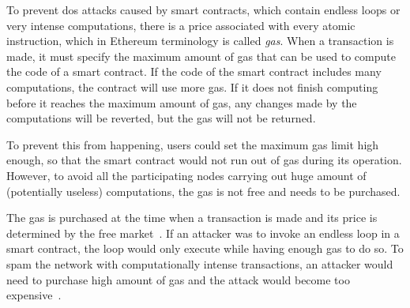 To prevent \acrfull{dos} attacks caused by smart contracts, which contain endless loops or very intense computations, there is a price associated with every atomic instruction, which in Ethereum terminology is called \textit{gas}. When a transaction is made, it must specify the maximum amount of gas that can be used to compute the code of a smart contract. If the code of the smart contract includes many computations, the contract will use more gas. If it does not finish computing before it reaches the maximum amount of gas, any changes made by the computations will be reverted, but the gas will not be returned.

To prevent this from happening, users could set the maximum gas limit high enough, so that the smart contract would not run out of gas during its operation. However, to avoid all the participating nodes carrying out huge amount of (potentially useless) computations, the gas is not free and needs to be purchased\footnotemark. 
% 

The gas is purchased at the time when a transaction is made and its price is determined by the free market~\cite{EthereumCommunityEthereumDocumentation}. If an attacker was to invoke an endless loop in a smart contract, the loop would only execute while having enough gas to do so. To spam the network with computationally intense transactions, an attacker would need to purchase high amount of gas and the attack would become too expensive~\cite[p.5]{Atzei2017ASoK}.

